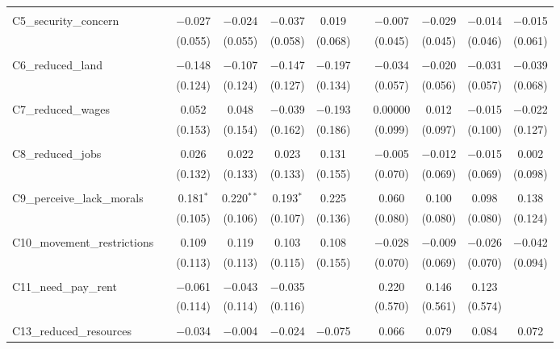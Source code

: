 \begin{table}[H]
\begin{tabular}{@{\extracolsep{4pt}}lcccccccccc}
  & & & & & & & & & & \\ 
 C5\_security\_concern &  & $-$0.027 & $-$0.024 & $-$0.037 & 0.019 &  & $-$0.007 & $-$0.029 & $-$0.014 & $-$0.015 \\ 
  &  & (0.055) & (0.055) & (0.058) & (0.068) &  & (0.045) & (0.045) & (0.046) & (0.061) \\ 
  & & & & & & & & & & \\ 
 C6\_reduced\_land &  & $-$0.148 & $-$0.107 & $-$0.147 & $-$0.197 &  & $-$0.034 & $-$0.020 & $-$0.031 & $-$0.039 \\ 
  &  & (0.124) & (0.124) & (0.127) & (0.134) &  & (0.057) & (0.056) & (0.057) & (0.068) \\ 
  & & & & & & & & & & \\ 
 C7\_reduced\_wages &  & 0.052 & 0.048 & $-$0.039 & $-$0.193 &  & 0.00000 & 0.012 & $-$0.015 & $-$0.022 \\ 
  &  & (0.153) & (0.154) & (0.162) & (0.186) &  & (0.099) & (0.097) & (0.100) & (0.127) \\ 
  & & & & & & & & & & \\ 
 C8\_reduced\_jobs &  & 0.026 & 0.022 & 0.023 & 0.131 &  & $-$0.005 & $-$0.012 & $-$0.015 & 0.002 \\ 
  &  & (0.132) & (0.133) & (0.133) & (0.155) &  & (0.070) & (0.069) & (0.069) & (0.098) \\ 
  & & & & & & & & & & \\ 
 C9\_perceive\_lack\_morals &  & 0.181$^{*}$ & 0.220$^{**}$ & 0.193$^{*}$ & 0.225 &  & 0.060 & 0.100 & 0.098 & 0.138 \\ 
  &  & (0.105) & (0.106) & (0.107) & (0.136) &  & (0.080) & (0.080) & (0.080) & (0.124) \\ 
  & & & & & & & & & & \\ 
 C10\_movement\_restrictions &  & 0.109 & 0.119 & 0.103 & 0.108 &  & $-$0.028 & $-$0.009 & $-$0.026 & $-$0.042 \\ 
  &  & (0.113) & (0.113) & (0.115) & (0.155) &  & (0.070) & (0.069) & (0.070) & (0.094) \\ 
  & & & & & & & & & & \\ 
 C11\_need\_pay\_rent &  & $-$0.061 & $-$0.043 & $-$0.035 &  &  & 0.220 & 0.146 & 0.123 &  \\ 
  &  & (0.114) & (0.114) & (0.116) &  &  & (0.570) & (0.561) & (0.574) &  \\ 
  & & & & & & & & & & \\ 
 C13\_reduced\_resources &  & $-$0.034 & $-$0.004 & $-$0.024 & $-$0.075 &  & 0.066 & 0.079 & 0.084 & 0.072 \\ 

\end{tabular}
\end{table}
